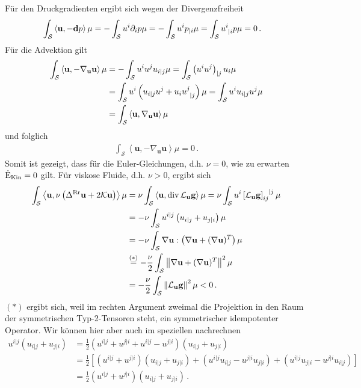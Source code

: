\documentclass[a4paper,11pt]{scrartcl}
\newcommand{\U}{u} %
\newcommand{\Ub}{\mathbf{\U}} %
\renewcommand{\P}{p} %
\newcommand{\g}{\mathbf{g}} %
\newcommand{\gauss}{\mathcal{K}} %
\newcommand{\dtekin}{\dot{\textup{E}}_{\textup{Kin}}} %
\newcommand{\surf}{\mathcal{S}} %
\renewcommand{\div}{\operatorname{div}} %
\newcommand{\lie}{\mathcal{L}} %
\newcommand{\exd}{\mathbf{d}} %
\newcommand{\lrr}{\Delta^{\textup{Rr}}} %
\newcommand{\formPeriod}{\,\text{.}}
\begin{document}
  Für den Druckgradienten ergibt sich wegen der Divergenzfreiheit
  \begin{align}
    \int_{\surf} \left\langle \Ub , -\exd\P \right\rangle \mu
        &=  -\int_{\surf} \U^{i}\partial_{i}\P \mu
         = -\int_{\surf} \U^{i} \P_{|i} \mu
         =  \int_{\surf}  \tensor{\U}{^{i}_{|i}}\P \mu = 0 \formPeriod
  \end{align}
  Für die Advektion gilt
  \begin{align}
    \int_{\surf} \left\langle \Ub , -\nabla_{\Ub}\Ub \right\rangle \mu
        &=  -\int_{\surf} \U^{i}\U^{j}\U_{i|j} \mu
         = \int_{\surf} \left( \U^{i}\U^{j} \right)_{|j}\U_{i} \mu \\
        &= \int_{\surf} \U^{i}\left( \U_{i|j}\U^{j} + \U_{i}\tensor{\U}{^{j}_{|j}} \right)\mu
         = \int_{\surf} \U^{i}\U_{i|j}\U^{j}\mu \\
        &= \int_{\surf} \left\langle \Ub , \nabla_{\Ub}\Ub \right\rangle \mu
  \end{align}
  und folglich
  \begin{align}
    \int_{\surf} \left\langle \Ub , -\nabla_{\Ub}\Ub \right\rangle \mu = 0 \formPeriod
  \end{align}
  Somit ist gezeigt, dass für die Euler-Gleichungen, d.h. \( \nu=0 \), wie zu erwarten \( \dtekin = 0 \) gilt.
  Für viskose Fluide, d.h. \( \nu > 0 \), ergibt sich
  \begin{align}
    \int_{\surf} \left\langle \Ub , \nu\left( \lrr\Ub + 2\gauss\Ub\right) \right\rangle \mu
      &= \nu \int_{\surf} \left\langle \Ub , \div\lie_{\Ub}\g \right\rangle \mu 
       = \nu \int_{\surf} \U^{i} \tensor{\left[\lie_{\Ub}\g \right]}{_{ij}^{|j}} \mu\\
      &= -\nu \int_{\surf} \U^{i|j}\left( \U_{i|j} + \U_{j|i} \right) \mu\\
      &= -\nu \int_{\surf} \nabla\Ub : \left( \nabla\Ub + (\nabla\Ub)^{T} \right)\mu \\
      &\overset{(*)}{=} -\frac{\nu}{2} \int_{\surf} \left\| \nabla\Ub + (\nabla\Ub)^{T}  \right\|^{2} \mu\\
      &= -\frac{\nu}{2} \int_{\surf} \left\| \lie_{\Ub}\g  \right\|^{2} \mu < 0
      \formPeriod
  \end{align}
  \( (*) \) ergibt sich, weil im rechten Argument zweimal die Projektion in den Raum der symmetrischen Typ-2-Tensoren steht,
  ein symmetrischer idempotenter Operator.
  Wir können hier aber auch im speziellen nachrechnen
  \begin{align}
    \U^{i|j}\left( \U_{i|j} + \U_{j|i} \right)
      &= \frac{1}{2}\left( \U^{i|j} + \U^{j|i} + \U^{i|j} -  \U^{j|i}\right)\left( \U_{i|j} + \U_{j|i} \right) \\
      &= \frac{1}{2}\left[\left( \U^{i|j} + \U^{j|i} \right)\left( \U_{i|j} + \U_{j|i} \right)
          +\left(  \U^{i|j}\U_{i|j} - \U^{j|i}\U_{j|i} \right)
          +\left(  \U^{i|j}\U_{j|i} -  \U^{j|i}\U_{i|j}\right)\right] \\
      &= \frac{1}{2}\left( \U^{i|j} + \U^{j|i} \right)\left( \U_{i|j} + \U_{j|i} \right) \formPeriod
  \end{align}
\end{document}
